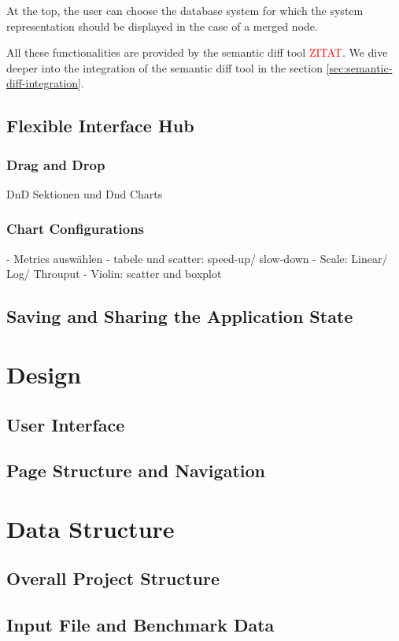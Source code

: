 At the top, the user can choose the database system for which the system representation should be displayed in the case of a merged node.

All these functionalities are provided by the semantic diff tool \textcolor{red}{ZITAT}. We dive deeper into the integration of the semantic diff tool in the section \ref{sec:semantic-diff-integration}.


\subsection{Flexible Interface Hub}
\subsubsection{Drag and Drop}
DnD Sektionen und Dnd Charts
\subsubsection{Chart Configurations}
- Metrics auswählen
- tabele und scatter: speed-up/ slow-down
- Scale: Linear/ Log/ Throuput
- Violin: scatter und boxplot
\subsection{Saving and Sharing the Application State}


\section{Design}
\subsection{User Interface}
\subsection{Page Structure and Navigation}
\subsubsection{}

\section{Data Structure}
\subsection{Overall Project Structure}
\subsection{Input File and Benchmark Data}


